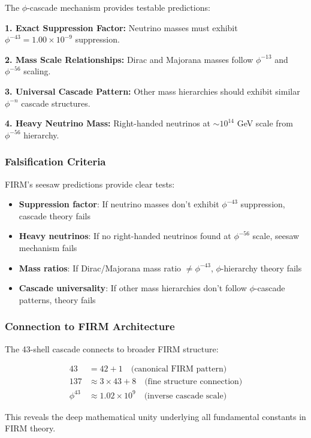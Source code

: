 The $\phi$-cascade mechanism provides testable predictions:

\textbf{1. Exact Suppression Factor:}
Neutrino masses must exhibit $\phi^{-43} = 1.00 \times 10^{-9}$ suppression.

\textbf{2. Mass Scale Relationships:}
Dirac and Majorana masses follow $\phi^{-13}$ and $\phi^{-56}$ scaling.

\textbf{3. Universal Cascade Pattern:}
Other mass hierarchies should exhibit similar $\phi^{-n}$ cascade structures.

\textbf{4. Heavy Neutrino Mass:}
Right-handed neutrinos at $\sim 10^{14}$ GeV scale from $\phi^{-56}$ hierarchy.

\subsubsection{Falsification Criteria}

FIRM's seesaw predictions provide clear tests:

\begin{itemize}
\item \textbf{Suppression factor}: If neutrino masses don't exhibit $\phi^{-43}$ suppression, cascade theory fails
\item \textbf{Heavy neutrinos}: If no right-handed neutrinos found at $\phi^{-56}$ scale, seesaw mechanism fails
\item \textbf{Mass ratios}: If Dirac/Majorana mass ratio $\neq \phi^{-43}$, $\phi$-hierarchy theory fails
\item \textbf{Cascade universality}: If other mass hierarchies don't follow $\phi$-cascade patterns, theory fails
\end{itemize}

\subsubsection{Connection to FIRM Architecture}

The 43-shell cascade connects to broader FIRM structure:

\begin{align}
43 &= 42 + 1 \quad \text{(canonical FIRM pattern)} \\
137 &\approx 3 \times 43 + 8 \quad \text{(fine structure connection)} \\
\phi^{43} &\approx 1.02 \times 10^9 \quad \text{(inverse cascade scale)}
\end{align}

This reveals the deep mathematical unity underlying all fundamental constants in FIRM theory.

